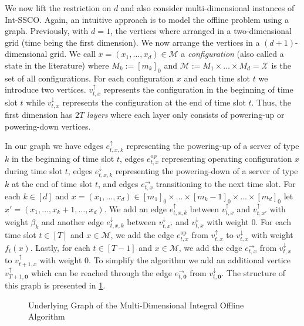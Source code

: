 We now lift the restriction on $d$ and also consider multi-dimensional instances of Int-SSCO. Again, an intuitive approach is to model the offline problem using a graph. Previously, with $d = 1$, the vertices where arranged in a two-dimensional grid (time being the first dimension). We now arrange the vertices in a $(d+1)$-dimensional grid. We call $x = (x_1, \dots, x_d) \in \mathcal{M}$ a \emph{configuration} (also called a state in the literature) where $M_k := [m_k]_0$ and $\mathcal{M} := M_1 \times \dots \times M_d = \mathcal{X}$ is the set of all configurations. For each configuration $x$ and each time slot $t$ we introduce two vertices. $v_{t,x}^{\uparrow}$ represents the configuration in the beginning of time slot $t$ while $v_{t,x}^{\downarrow}$ represents the configuration at the end of time slot $t$. Thus, the first dimension has $2 T$ \emph{layers} where each layer only consists of powering-up or powering-down vertices.

In our graph we have edges $e_{t,x,k}^{\uparrow}$ representing the powering-up of a server of type $k$ in the beginning of time slot $t$, edges $e_{t,x}^{\text{op}}$ representing operating configuration $x$ during time slot $t$, edges $e_{t,x,k}^{\downarrow}$ representing the powering-down of a server of type $k$ at the end of time slot $t$, and edges $e_{t,x}^{\rightarrow}$ transitioning to the next time slot. For each $k \in [d]$ and $x = (x_1, \dots, x_d) \in [m_1]_0 \times \dots \times [m_k - 1]_0 \times \dots \times [m_d]_0$ let $x' = (x_1, \dots, x_k + 1, \dots, x_d)$. We add an edge $e_{t,x,k}^{\uparrow}$ between $v_{t,x}^{\uparrow}$ and $v_{t,x'}^{\uparrow}$ with weight $\beta_k$ and another edge $e_{t,x,k}^{\downarrow}$ between $v_{t,x'}^{\downarrow}$ and $v_{t,x}^{\downarrow}$ with weight $0$. For each time slot $t \in [T]$ and $x \in \mathcal{M}$, we add the edge $e_{t,x}^{\text{op}}$ from $v_{t,x}^{\uparrow}$ to $v_{t,x}^{\downarrow}$ with weight $f_t(x)$. Lastly, for each $t \in [T-1]$ and $x \in \mathcal{M}$, we add the edge $e_{t,x}^{\rightarrow}$ from $v_{t,x}^{\downarrow}$ to $v_{t+1,x}^{\uparrow}$ with weight $0$.  To simplify the algorithm we add an additional vertice $v_{T+1,\mathbf{0}}^{\uparrow}$ which can be reached through the edge $e_{t,\mathbf{0}}^{\rightarrow}$ from $v_{t,\mathbf{0}}^{\downarrow}$. The structure of this graph is presented in \cref{fig:underlying_graph_of_the_multi_dimensional_integral_offline_algorithm}.

\begin{figure}
    \centering
    [TODO]
    \caption{Underlying Graph of the Multi-Dimensional Integral Offline Algorithm}
    \label{fig:underlying_graph_of_the_multi_dimensional_integral_offline_algorithm}
\end{figure}

